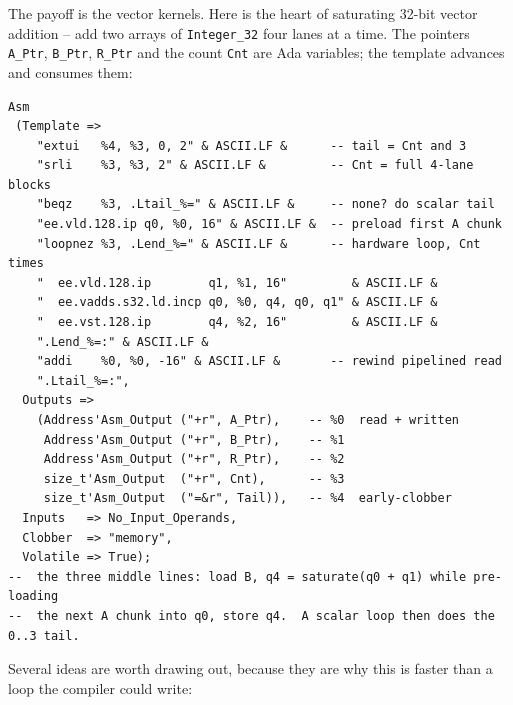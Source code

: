 The payoff is the vector kernels. Here is the heart of saturating 32-bit vector
addition -- add two arrays of \texttt{Integer\_32} four lanes at a time. The
pointers \texttt{A\_Ptr}, \texttt{B\_Ptr}, \texttt{R\_Ptr} and the count
\texttt{Cnt} are Ada variables; the template advances and consumes them:

\begin{lstlisting}
Asm
 (Template =>
    "extui   %4, %3, 0, 2" & ASCII.LF &      -- tail = Cnt and 3
    "srli    %3, %3, 2" & ASCII.LF &         -- Cnt = full 4-lane blocks
    "beqz    %3, .Ltail_%=" & ASCII.LF &     -- none? do scalar tail
    "ee.vld.128.ip q0, %0, 16" & ASCII.LF &  -- preload first A chunk
    "loopnez %3, .Lend_%=" & ASCII.LF &      -- hardware loop, Cnt times
    "  ee.vld.128.ip        q1, %1, 16"         & ASCII.LF &
    "  ee.vadds.s32.ld.incp q0, %0, q4, q0, q1" & ASCII.LF &
    "  ee.vst.128.ip        q4, %2, 16"         & ASCII.LF &
    ".Lend_%=:" & ASCII.LF &
    "addi    %0, %0, -16" & ASCII.LF &       -- rewind pipelined read
    ".Ltail_%=:",
  Outputs =>
    (Address'Asm_Output ("+r", A_Ptr),    -- %0  read + written
     Address'Asm_Output ("+r", B_Ptr),    -- %1
     Address'Asm_Output ("+r", R_Ptr),    -- %2
     size_t'Asm_Output  ("+r", Cnt),      -- %3
     size_t'Asm_Output  ("=&r", Tail)),   -- %4  early-clobber
  Inputs   => No_Input_Operands,
  Clobber  => "memory",
  Volatile => True);
--  the three middle lines: load B, q4 = saturate(q0 + q1) while pre-loading
--  the next A chunk into q0, store q4.  A scalar loop then does the 0..3 tail.
\end{lstlisting}

Several ideas are worth drawing out, because they are why this is faster than a
loop the compiler could write:

